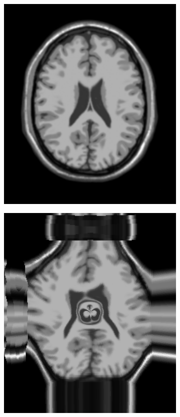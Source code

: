 \documentclass[t]{beamer}
\begin{document}
\begin{frame}
  \begin{figure}[H]
    \centering
    \begin{subfigure}[b]{0.49\textwidth}
      \includegraphics[width=1\textwidth]{figuras/screen.png}
    \end{subfigure}
    \begin{subfigure}[b]{0.49\textwidth}
      \includegraphics[width=1\textwidth]{figuras/resultDistSin.png}

\end{subfigure}
\end{figure}
\end{frame}
\end{document}
